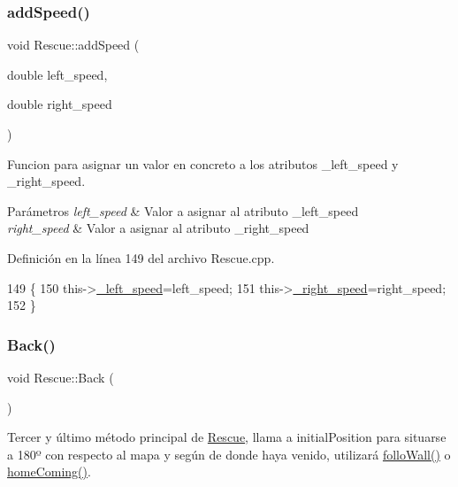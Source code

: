 \subsubsection{\texorpdfstring{add\+Speed()}{addSpeed()}}
{\footnotesize\ttfamily void Rescue\+::add\+Speed (\begin{DoxyParamCaption}\item[{double}]{left\+\_\+speed,  }\item[{double}]{right\+\_\+speed }\end{DoxyParamCaption})}



Funcion para asignar un valor en concreto a los atributos \+\_\+left\+\_\+speed y \+\_\+right\+\_\+speed. 


\begin{DoxyParams}{Parámetros}
{\em left\+\_\+speed} & Valor a asignar al atributo \+\_\+left\+\_\+speed \\
\hline
{\em right\+\_\+speed} & Valor a asignar al atributo \+\_\+right\+\_\+speed \\
\hline
\end{DoxyParams}


Definición en la línea 149 del archivo Rescue.\+cpp.


\begin{DoxyCode}
149                                                          \{
150       this->\hyperlink{classRescue_a29d594459f17968e6db993605d239c47_a29d594459f17968e6db993605d239c47}{\_left\_speed}=left\_speed;
151       this->\hyperlink{classRescue_ab2fac6f0352d593bfc083709ecc9ddc1_ab2fac6f0352d593bfc083709ecc9ddc1}{\_right\_speed}=right\_speed;
152 \}
\end{DoxyCode}
\mbox{\label{classRescue_a5acc91c16b60baf09a87f440a22f030f_a5acc91c16b60baf09a87f440a22f030f}} 
\subsubsection{\texorpdfstring{Back()}{Back()}}
{\footnotesize\ttfamily void Rescue\+::\+Back (\begin{DoxyParamCaption}{ }\end{DoxyParamCaption})}



Tercer y último método principal de \hyperlink{classRescue}{Rescue}, llama a initial\+Position para situarse a 180º con respecto al mapa y según de donde haya venido, utilizará \hyperlink{classRescue_aa9f20abea5898b53b03db91f2a323982_aa9f20abea5898b53b03db91f2a323982}{follo\+Wall()} o \hyperlink{classRescue_a85cbbec8d486f16e260d3f74c3221831_a85cbbec8d486f16e260d3f74c3221831}{home\+Coming()}. 

